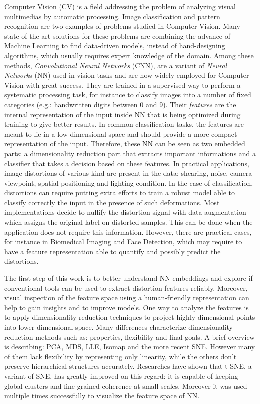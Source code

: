 \documentclass[a4paper,12pt]{report}
\newcommand{\eg}{e.g.}
\begin{document}
Computer Vision (CV) is a field addressing the problem of analyzing visual multimedias by automatic processing.
Image classification and pattern recognition are two examples of problems studied in Computer Vision.
Many state-of-the-art solutions for these problems are combining the advance of Machine Learning to find data-driven models, instead of hand-designing algorithms, which usually requires expert knowledge of the domain.
Among these methods, {\em Convolutional Neural Networks} (CNN), are a variant of {\em Neural Network}s (NN) used in vision tasks and are now widely employed for Computer Vision with great success\cite{krizhevsky2012imagenet}\cite{rowley1998neural}\cite{prechelt1994proben1}.
They are trained in a supervised way to perform a systematic processing task, for instance to classify images into a number of fixed categories (\eg: handwritten digits between 0 and 9).
Their {\em features} are the internal representation of the input inside NN that is being optimized during training to give better results.
In common classification tasks, the features are meant to lie in a low dimensional space and should provide a more compact representation of the input.
Therefore, these NN can be seen as two embedded parts: a dimensionality reduction part that extracts important informations and a classifier that takes a decision based on these features.
In practical applications, image distortions of various kind are present in the data: shearing, noise, camera viewpoint, spatial positioning and lighting condition.
In the case of classification, distortions can require putting extra efforts to train a robust model able to classify correctly the input in the presence of such deformations.
Most implementations decide to nullify the distortion signal with data-augmentation which assigns the original label on distorted samples.
This can be done when the application does not require this information.
However, there are practical cases, for instance in Biomedical Imaging and Face Detection, which may require to have a feature representation able to quantify and possibly predict the distortions.

The first step of this work is to better understand NN embeddings and explore if conventional tools can be used to extract distortion features reliably.
Moreover, visual inspection of the feature space using a human-friendly representation can help to gain insights and to improve models.
One way to analyze the features is to apply dimensionality reduction techniques to project highly-dimensional points into lower dimensional space.
Many differences characterize dimensionality reduction methods such as: properties, flexibility and final goals.
A brief overview is describing: PCA, MDS, LLE, Isomap and the more recent SNE.
However many of them lack flexibility by representing only linearity, while the others don't preserve hierarchical structures accurately\cite{t-SNE}.
Researches have shown that t-SNE, a variant of SNE, has greatly improved on this regard: it is capable of keeping global clusters and fine-grained coherence at small scales.
Moreover it was used multiple times successfully to visualize the feature space of NN\cite{donahue2013decaf}\cite{yu2014visualizing}.
\end{document}
